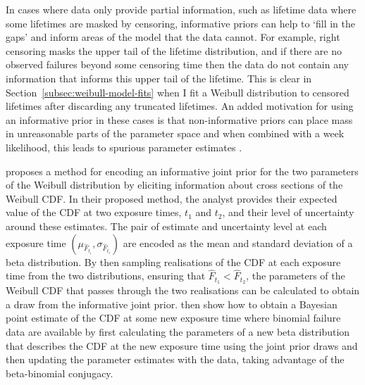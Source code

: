 In cases where data only provide partial information, such as lifetime data where some lifetimes are masked by censoring, informative priors can help to `fill in the gaps' and inform areas of the model that the data cannot. For example, right censoring masks the upper tail of the lifetime distribution, and if there are no observed failures beyond some censoring time then the data do not contain any information that informs this upper tail of the lifetime. This is clear in Section~\ref{subsec:weibull-model-fits} when I fit a Weibull distribution to censored lifetimes after discarding any truncated lifetimes. An added motivation for using an informative prior in these cases is that non-informative priors can place mass in unreasonable parts of the parameter space and when combined with a week likelihood, this leads to spurious parameter estimates \citep{tian2024}.

\citet{kaminskiy2005} proposes a method for encoding an informative joint prior for the two parameters of the Weibull distribution by eliciting information about cross sections of the Weibull CDF. In their proposed method, the analyst provides their expected value of the CDF at two exposure times, $t_1$ and $t_2$, and their level of uncertainty around these estimates. The pair of estimate and uncertainty level at each exposure time $(\mu_{\hat{F}_{t_i}}, \sigma_{\hat{F}_{t_i}})$ are encoded as the mean and standard deviation of a beta distribution. By then sampling realisations of the CDF at each exposure time from the two distributions, ensuring that $\hat{F}_{t_1} < \hat{F}_{t_2}$, the parameters of the Weibull CDF that passes through the two realisations can be calculated to obtain a draw from the informative joint prior. \citeauthor{kaminskiy2005} then show how to obtain a Bayesian point estimate of the CDF at some new exposure time where binomial failure data are available by first calculating the parameters of a new beta distribution that describes the CDF at the new exposure time using the joint prior draws and then updating the parameter estimates with the data, taking advantage of the beta-binomial conjugacy.

